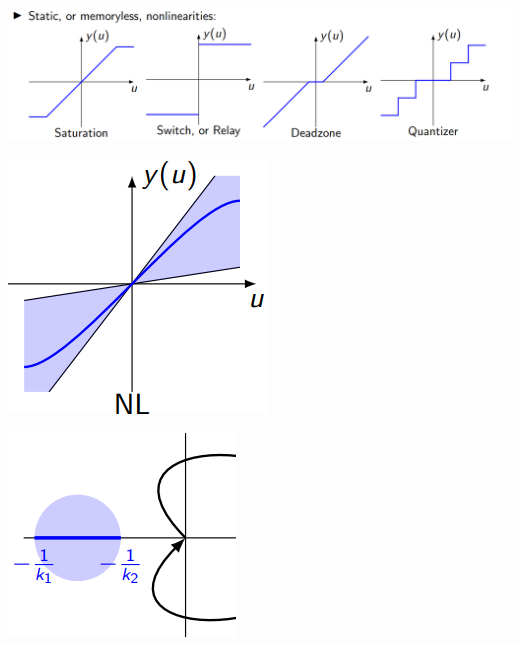 \includegraphics[width = \linewidth]{src/images/nonlinearity_example.png}
\begin{minipage}{0.29\linewidth}
    \includegraphics[width = \linewidth]{src/images/nolinearity_plot.png}
\end{minipage}
\begin{minipage}{0.29\linewidth}
    \includegraphics[width = \linewidth]{src/images/nolinearity_nyquist.png}
\end{minipage}
